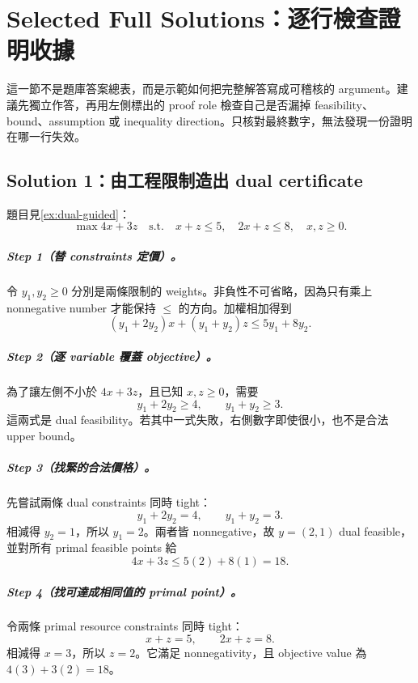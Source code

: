 \documentclass[11pt,a4paper,oneside,openany]{book}
\begin{document}
\chapter*{Selected Full Solutions：逐行檢查證明收據}
這一節不是題庫答案總表，而是示範如何把完整解答寫成可稽核的 argument。建議先獨立作答，再用左側標出的 proof role 檢查自己是否漏掉 feasibility、bound、assumption 或 inequality direction。只核對最終數字，無法發現一份證明在哪一行失效。

\section*{Solution 1：由工程限制造出 dual certificate}
題目見\cref{ex:dual-guided}：
\[
 \max 4x+3z
 \quad\text{s.t.}\quad
 x+z\le5,\quad 2x+z\le8,\quad x,z\ge0.
\]

\paragraph{Step 1（替 constraints 定價）。}
令 $y_1,y_2\ge0$ 分別是兩條限制的 weights。非負性不可省略，因為只有乘上 nonnegative number 才能保持 $\le$ 的方向。加權相加得到
\[
 (y_1+2y_2)x+(y_1+y_2)z\le5y_1+8y_2.
\]

\paragraph{Step 2（逐 variable 覆蓋 objective）。}
為了讓左側不小於 $4x+3z$，且已知 $x,z\ge0$，需要
\[
 y_1+2y_2\ge4,
 \qquad
 y_1+y_2\ge3.
\]
這兩式是 dual feasibility。若其中一式失敗，右側數字即使很小，也不是合法 upper bound。

\paragraph{Step 3（找緊的合法價格）。}
先嘗試兩條 dual constraints 同時 tight：
\[
 y_1+2y_2=4,\qquad y_1+y_2=3.
\]
相減得 $y_2=1$，所以 $y_1=2$。兩者皆 nonnegative，故 $y=(2,1)$ dual feasible，並對所有 primal feasible points 給
\[
 4x+3z\le5(2)+8(1)=18.
\]

\paragraph{Step 4（找可達成相同值的 primal point）。}
令兩條 primal resource constraints 同時 tight：
\[
 x+z=5,\qquad 2x+z=8.
\]
相減得 $x=3$，所以 $z=2$。它滿足 nonnegativity，且 objective value 為 $4(3)+3(2)=18$。
\end{document}
